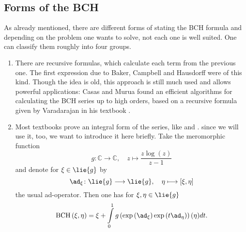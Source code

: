 \subsection{Forms of the BCH}
As already mentioned, there are different forms of stating the BCH formula and 
depending on the problem one wants to solve, not each one is well suited. One 
can classify them roughly into four groups.
\begin{enumerate}
	\item
	There are recursive formulas, which calculate each term from the previous 
	one. The first expression due to Baker, Campbell and Hausdorff were of 
	this kind. Though the idea is old, this approach is still much used and 
	allows powerful applications: Casas and Murua found an efficient 
	algorithms \cite{casas.murua:yeara} for calculating the BCH series up to 
	high orders, based on a recursive formula given by Varadarajan in his 
	textbook \cite{varadarajan:yeara}.
	
	\item
	Most textbooks prove an integral form of the series, like 
	\cite{hall:yeara} and \cite{hilgert.neeb:2012a}. since we will use it, 
	too, we want to introduce it here briefly. Take the meromorphic function
	\begin{equation}
		\label{Alg:DefinitionLogBernoullis}
		g \colon 
		\mathbb{C}
		\longrightarrow
		\mathbb{C},
		\quad
		z 
		\longmapsto
		\frac{ z \log(z) }{z - 1}
	\end{equation}
	and denote for $\xi \in \lie{g}$ by
	\begin{equation*}
		\ad_{\xi}
		\colon
		\lie{g}
		\longrightarrow
		\lie{g},
		\quad
		\eta
		\longmapsto
		[\xi, \eta]
	\end{equation*}
	the usual ad-operator. Then one has for $\xi, \eta \in \lie{g}$
	\begin{equation}
		\label{Alg:BCHinIntegral}
		\bch{\xi}{\eta}
		=
		\xi + 
		\int\limits_0^1
		g \left( 
			\exp \left(
				\ad_{\xi}
			\right)
			\exp \left(
				t \ad_{\eta}
			\right)
		\right)
		(\eta) 
		dt.
	\end{equation}
	

\end{enumerate}
